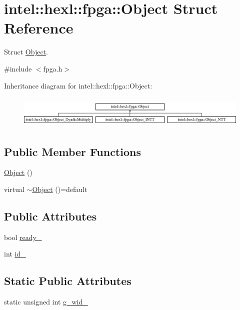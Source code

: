 \hypertarget{structintel_1_1hexl_1_1fpga_1_1Object}{\section{intel\-:\-:hexl\-:\-:fpga\-:\-:Object Struct Reference}
\label{structintel_1_1hexl_1_1fpga_1_1Object}
}


Struct \hyperlink{structintel_1_1hexl_1_1fpga_1_1Object}{Object}.  




{\ttfamily \#include $<$fpga.\-h$>$}

Inheritance diagram for intel\-:\-:hexl\-:\-:fpga\-:\-:Object\-:\begin{figure}[H]
\begin{center}
\leavevmode
\includegraphics[height=1.575246cm]{structintel_1_1hexl_1_1fpga_1_1Object}
\end{center}
\end{figure}
\subsection*{Public Member Functions}
\begin{DoxyCompactItemize}
\item 
\hyperlink{structintel_1_1hexl_1_1fpga_1_1Object_afa220dffb807566bebbfa2e0349cedf9}{Object} ()
\item 
virtual \hyperlink{structintel_1_1hexl_1_1fpga_1_1Object_a53dd49a3d2fe50a55d91eda3f139e04f}{$\sim$\-Object} ()=default
\end{DoxyCompactItemize}
\subsection*{Public Attributes}
\begin{DoxyCompactItemize}
\item 
bool \hyperlink{structintel_1_1hexl_1_1fpga_1_1Object_a8d6495f3b68194f0c38927d76e9c652c}{ready\-\_\-}
\item 
int \hyperlink{structintel_1_1hexl_1_1fpga_1_1Object_ade9313d87b44bc1bfeccca2f5829ceae}{id\-\_\-}
\end{DoxyCompactItemize}
\subsection*{Static Public Attributes}
\begin{DoxyCompactItemize}
\item 
static unsigned int \hyperlink{structintel_1_1hexl_1_1fpga_1_1Object_a0da02feafb293ff8cea005f6312bd638}{g\-\_\-wid\-\_\-}
\end{DoxyCompactItemize}


